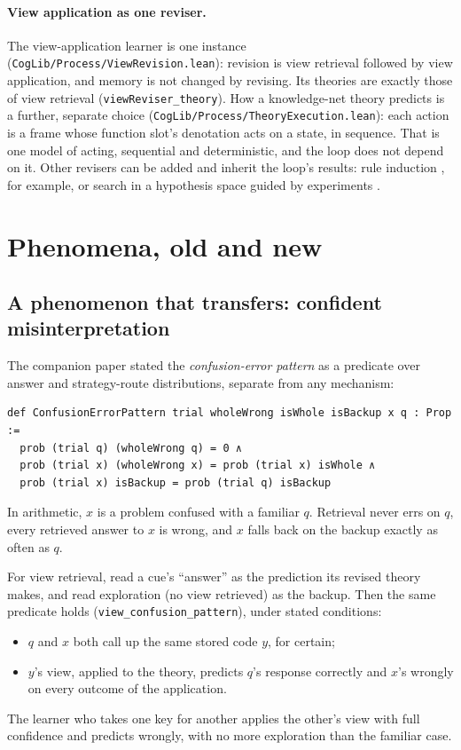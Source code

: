 \documentclass[11pt]{article}
\newcommand{\code}[1]{\texttt{#1}}
\newcommand{\lean}[1]{\texttt{#1}}
\begin{document}
\paragraph{View application as one reviser.} The view-application learner is one instance (\code{CogLib/Process/ViewRevision.lean}): revision is view retrieval followed by view application, and memory is not changed by revising. Its theories are exactly those of view retrieval (\lean{viewReviser\_theory}). How a knowledge-net theory predicts is a further, separate choice (\code{CogLib/Process/TheoryExecution.lean}): each action is a frame whose function slot's denotation acts on a state, in sequence. That is one model of acting, sequential and deterministic, and the loop does not depend on it. Other revisers can be added and inherit the loop's results: rule induction \citep{holland1986}, for example, or search in a hypothesis space guided by experiments \citep{klahr1988}.

\section{Phenomena, old and new}
\label{sec:phen}

\subsection{A phenomenon that transfers: confident misinterpretation}

The companion paper stated the \emph{confusion-error pattern} as a predicate over answer and strategy-route distributions, separate from any mechanism:
\begin{Verbatim}[fontsize=\small]
def ConfusionErrorPattern trial wholeWrong isWhole isBackup x q : Prop :=
  prob (trial q) (wholeWrong q) = 0 ∧
  prob (trial x) (wholeWrong x) = prob (trial x) isWhole ∧
  prob (trial x) isBackup = prob (trial q) isBackup
\end{Verbatim}
In arithmetic, $x$ is a problem confused with a familiar $q$. Retrieval never errs on $q$, every retrieved answer to $x$ is wrong, and $x$ falls back on the backup exactly as often as $q$.

For view retrieval, read a cue's ``answer'' as the prediction its revised theory makes, and read exploration (no view retrieved) as the backup. Then the same predicate holds (\lean{view\_confusion\_pattern}), under stated conditions:
\begin{itemize}
  \item $q$ and $x$ both call up the same stored code $y$, for certain;
  \item $y$'s view, applied to the theory, predicts $q$'s response correctly and $x$'s wrongly on every outcome of the application.
\end{itemize}
The learner who takes one key for another applies the other's view with full confidence and predicts wrongly, with no more exploration than the familiar case.
\end{document}
